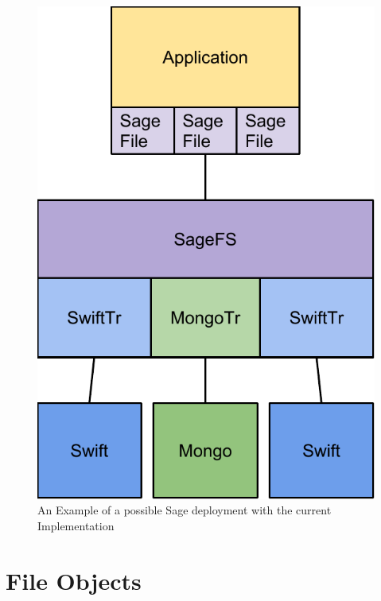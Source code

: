 \begin{figure}[h]
\centering
\includegraphics[scale=0.7]{figures/implementation}
\caption[Example Sage Deployment]{An Example of a possible Sage deployment with the current Implementation}
\label{fig:implementation}
\end{figure}


\section{File Objects}

